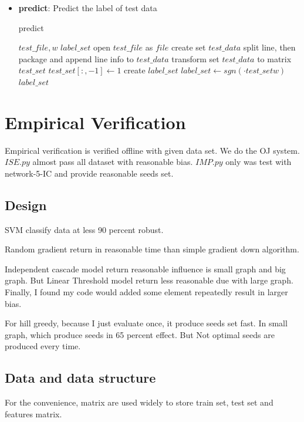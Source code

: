 \documentclass[conference,compsoc]{IEEEtran}
\renewcommand{\algorithmicrequire}{\textbf{Input:}}
\renewcommand{\algorithmicensure}{\textbf{Output:}}
\begin{document}
\begin{itemize}
 \item \textbf{predict}: Predict the label of test data
     \begin{algorithm}[H]
     \caption{predict}
     \begin{algorithmic}[4]
     \renewcommand{\algorithmicrequire}{\textbf{Input:}}
     \renewcommand{\algorithmicensure}{\textbf{Output:}}
     \REQUIRE $test\_file, w$
     \ENSURE  $label\_set$
     \STATE open $test\_file$ as $file$
     \STATE create set $test\_data$
          \STATE split line, then package and append line info to $test\_data$
     \ENDFOR
     \STATE transform set $test\_data$ to matrix $test\_set$
     \STATE $test\_set[:, -1] \leftarrow 1$
     \STATE create $label\_set$
     \STATE $label\_set \leftarrow  sgn(\cdot{test\_set}{w})$
     \RETURN $label\_set$
     \end{algorithmic}
     \end{algorithm}
 

\end{itemize}


\section{Empirical Verification}
Empirical verification is verified offline with given data set. We do the 
OJ system. $ISE.py$ almost pass all
dataset with reasonable bias. $IMP.py$ only was test with network-5-IC and
provide reasonable seeds set.

\subsection{Design}
SVM classify data at less 90 percent robust.

Random gradient return in reasonable time than simple gradient down algorithm.

Independent cascade model return reasonable influence is small graph and big graph.
But Linear Threshold model return less reasonable due with large graph. Finally,
I found my code would added some element repeatedly result in larger bias.

For hill greedy, because I just evaluate once, it produce seeds set fast. In
small graph, which produce seeds in 65 percent effect. But
Not optimal seeds are produced every time.

\subsection{Data and data structure}
For the convenience, matrix are used widely to store train set, test set and
features matrix.
\end{document}
